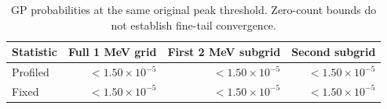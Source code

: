\begin{table}[H]\centering\small
\begin{tabular}{lrrr}\toprule
Statistic & Full 1 MeV grid & First 2 MeV subgrid & Second subgrid\\\midrule
Profiled & $<$$1.50\times10^{-5}$ & $<$$1.50\times10^{-5}$ & $<$$1.50\times10^{-5}$ \\
Fixed & $<$$1.50\times10^{-5}$ & $<$$1.50\times10^{-5}$ & $<$$1.50\times10^{-5}$ \\
\bottomrule\end{tabular}
\caption{GP probabilities at the same original peak threshold. Zero-count bounds do not establish fine-tail convergence.}\end{table}

